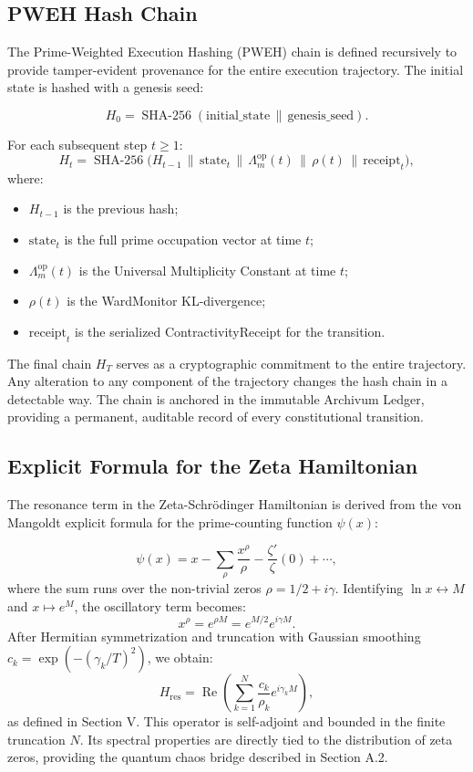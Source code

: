 \documentclass[12pt]{article}
\theoremstyle{plain}
\theoremstyle{definition}
\theoremstyle{remark}
\begin{document}
\subsection{PWEH Hash Chain}

The Prime-Weighted Execution Hashing (PWEH) chain is defined recursively to provide tamper-evident provenance for the entire execution trajectory. The initial state is hashed with a genesis seed:

\[
H_0 = \operatorname{SHA\text{-}256}(\text{initial\_state} \,\|\, \text{genesis\_seed}).
\]

For each subsequent step $t \geq 1$:
\[
H_t = \operatorname{SHA\text{-}256}\bigl(
H_{t-1} \,\|\,
\text{state}_t \,\|\,
\Lambda_m^{\text{op}}(t) \,\|\,
\rho(t) \,\|\,
\text{receipt}_t
\bigr),
\]
where:
\begin{itemize}
    \item $H_{t-1}$ is the previous hash;
    \item $\text{state}_t$ is the full prime occupation vector at time $t$;
    \item $\Lambda_m^{\text{op}}(t)$ is the Universal Multiplicity Constant at time $t$;
    \item $\rho(t)$ is the WardMonitor KL-divergence;
    \item $\text{receipt}_t$ is the serialized ContractivityReceipt for the transition.
\end{itemize}

The final chain $H_T$ serves as a cryptographic commitment to the entire trajectory. Any alteration to any component of the trajectory changes the hash chain in a detectable way. The chain is anchored in the immutable Archivum Ledger, providing a permanent, auditable record of every constitutional transition.

\subsection{Explicit Formula for the Zeta Hamiltonian}

The resonance term in the Zeta-Schrödinger Hamiltonian is derived from the von Mangoldt explicit formula for the prime-counting function $\psi(x)$:

\[
\psi(x) = x - \sum_{\rho} \frac{x^\rho}{\rho} - \frac{\zeta'}{\zeta}(0) + \cdots,
\]
where the sum runs over the non-trivial zeros $\rho = 1/2 + i\gamma$. Identifying $\ln x \leftrightarrow M$ and $x \mapsto e^M$, the oscillatory term becomes:
\[
x^\rho = e^{\rho M} = e^{M/2} e^{i\gamma M}.
\]
After Hermitian symmetrization and truncation with Gaussian smoothing $c_k = \exp(-(\gamma_k/T)^2)$, we obtain:
\[
H_{\text{res}} = \operatorname{Re}\left( \sum_{k=1}^N \frac{c_k}{\rho_k} e^{i\gamma_k M} \right),
\]
as defined in Section V. This operator is self-adjoint and bounded in the finite truncation $N$. Its spectral properties are directly tied to the distribution of zeta zeros, providing the quantum chaos bridge described in Section A.2.
\end{document}
